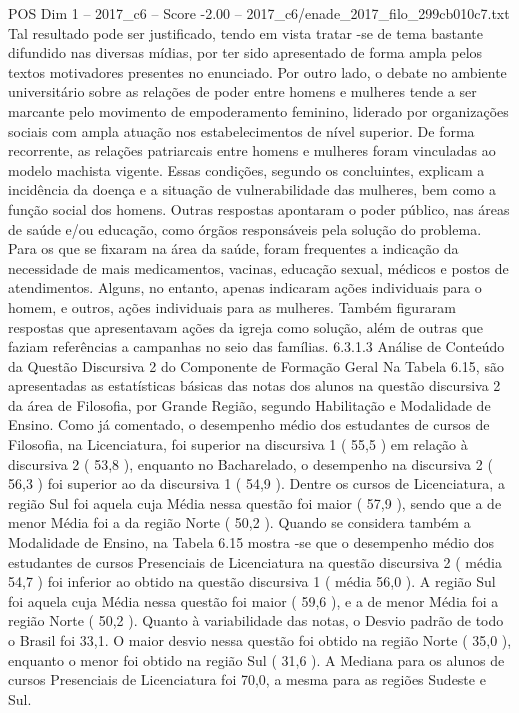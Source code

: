 \begin{textsample}{POS Dim 1 – 2017\_c6 – Score -2.00 – 2017\_c6/enade\_2017\_filo\_299cb010c7.txt}
Tal resultado pode ser justificado, tendo em vista tratar -se de tema bastante difundido nas diversas mídias, por ter sido apresentado de forma ampla pelos textos motivadores presentes no enunciado.
Por outro lado, o debate no ambiente universitário sobre as relações de poder entre homens e mulheres tende a ser marcante pelo movimento de empoderamento feminino, liderado por organizações sociais com ampla atuação nos estabelecimentos de nível superior.
De forma recorrente, as relações patriarcais entre homens e mulheres foram vinculadas ao modelo machista vigente.
Essas condições, segundo os concluintes, explicam a incidência da doença e a situação de vulnerabilidade das mulheres, bem como a função social dos homens.
Outras respostas apontaram o poder público, nas áreas de saúde e/ou educação, como órgãos responsáveis pela solução do problema.
Para os que se fixaram na área da saúde, foram frequentes a indicação da necessidade de mais medicamentos, vacinas, educação sexual, médicos e postos de atendimentos.
Alguns, no entanto, apenas indicaram ações individuais para o homem, e outros, ações individuais para as mulheres.
Também figuraram respostas que apresentavam ações da igreja como solução, além de outras que faziam referências a campanhas no seio das famílias. 6.3.1.3 Análise de Conteúdo da Questão Discursiva 2 do Componente de Formação Geral Na Tabela 6.15, são apresentadas as estatísticas básicas das notas dos alunos na questão discursiva 2 da área de Filosofia, por Grande Região, segundo Habilitação e Modalidade de Ensino.
Como já comentado, o desempenho médio dos estudantes de cursos de Filosofia, na Licenciatura, foi superior na discursiva 1 ( 55,5 ) em relação à discursiva 2 ( 53,8 ), enquanto no Bacharelado, o desempenho na discursiva 2 ( 56,3 ) foi superior ao da discursiva 1 ( 54,9 ).
Dentre os cursos de Licenciatura, a região Sul foi aquela cuja Média nessa questão foi maior ( 57,9 ), sendo que a de menor Média foi a da região Norte ( 50,2 ).
Quando se considera também a Modalidade de Ensino, na Tabela 6.15 mostra -se que o desempenho médio dos estudantes de cursos Presenciais de Licenciatura na questão discursiva 2 ( média 54,7 ) foi inferior ao obtido na questão discursiva 1 ( média 56,0 ).
A região Sul foi aquela cuja Média nessa questão foi maior ( 59,6 ), e a de menor Média foi a região Norte ( 50,2 ).
Quanto à variabilidade das notas, o Desvio padrão de todo o Brasil foi 33,1.
O maior desvio nessa questão foi obtido na região Norte ( 35,0 ), enquanto o menor foi obtido na região Sul ( 31,6 ).
A Mediana para os alunos de cursos Presenciais de Licenciatura foi 70,0, a mesma para as regiões Sudeste e Sul.

\end{textsample}
